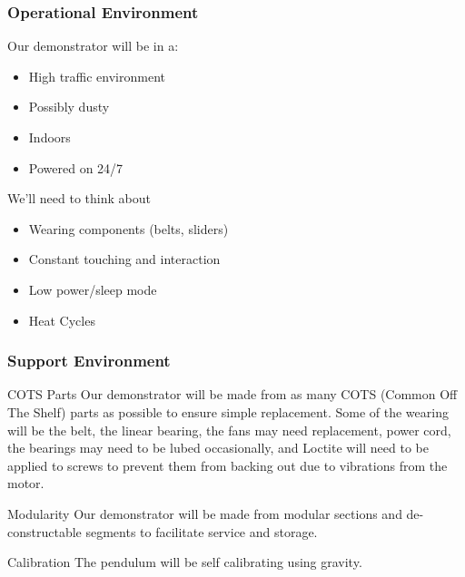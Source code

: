 \documentclass[aspectratio=169]{beamer}
\begin{document}
\begin{frame}
    \frametitle{Operational Environment}

    Our demonstrator will be in a:
    \begin{itemize}
        \item High traffic environment
        \item Possibly dusty
        \item Indoors
        \item Powered on 24/7
    \end{itemize}

    We'll need to think about

    \begin{itemize}
        \item Wearing components (belts, sliders)
        \item Constant touching and interaction
        \item Low power/sleep mode
        \item Heat Cycles
    \end{itemize}

\end{frame}


\begin{frame}
    \frametitle{Support Environment}

    \begin{block}{COTS Parts}
        Our demonstrator will be made from as many COTS (Common Off The Shelf) parts
        as possible to ensure simple replacement.
        Some of the wearing will be the belt, the linear bearing, the fans may need replacement, power cord, the bearings may need to be lubed occasionally, and Loctite will need to be applied to screws to prevent them from backing out due to vibrations from the motor. 
    \end{block}

    \begin{block}{Modularity}
        Our demonstrator will be made from modular sections and de-constructable segments
        to facilitate service and storage.
    \end{block}
    
    \begin{block}{Calibration}
        The pendulum will be self calibrating using gravity.
    \end{block}

\end{frame}
\end{document}

